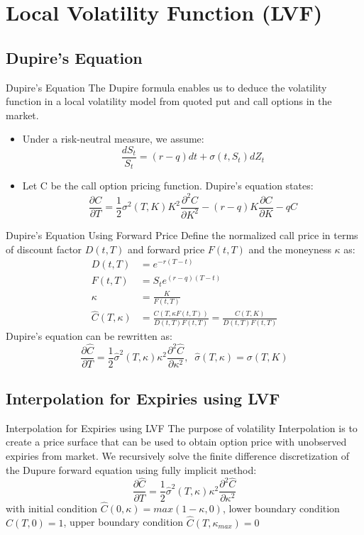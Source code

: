 \documentclass[10pt,table,mathserif]{beamer}
\begin{document}
\section{Local Volatility Function (LVF)}
\subsection{Dupire's Equation}
\begin{frame}{Dupire's Equation}
The Dupire formula enables us to deduce the volatility function in a local volatility
model from quoted put and call options in the market.
\begin{itemize}
	\item Under a risk-neutral measure, we assume:
	\[
	\frac{d S_t}{ S_t}= \left(r-q\right)dt +\sigma(t,S_t) dZ_t
	\]
	\item Let C be the call option pricing function. Dupire's equation states:
	\[
	\frac{\partial C}{\partial T}=\frac{1}{2} {\sigma}^2(T,K)K^2  \frac{\partial^2 C}{ \partial K^2}-(r-q) K\frac{\partial C}{\partial K}-qC
	\]
\end{itemize}
\end{frame}

\begin{frame}{Dupire's Equation Using Forward Price}
Define the normalized call price in terms of discount factor $D(t,T)$ and forward price $F(t,T)$ and the moneyness $\kappa$ as:
\[
\begin{split}
D(t,T)&=e^{-r(T-t)}\\
F(t,T)&=S_te^{(r-q)(T-t)}\\
\kappa&=\frac{K}{F(t,T)}\\
\widehat{C}(T,\kappa)&=\frac{C(T,\kappa F(t,T))}{D(t,T)F(t,T)}=\frac{C(T,K)}{D(t,T)F(t,T)}
\end{split}
\]
Dupire's equation can be rewritten as:
\[
\frac{\partial \widehat{C}}{\partial T}=\frac{1}{2} \widehat{\sigma}^2(T,\kappa) \kappa^2  \frac{\partial^2 \widehat{C}}{ \partial \kappa^2},\;\; \widehat{\sigma}(T,\kappa)={\sigma}(T,K)
\]
\end{frame}

\subsection{Interpolation  for Expiries using LVF}

\begin{frame}{Interpolation  for Expiries using LVF}
The purpose of volatility Interpolation \footnotemark \; is to create a price surface that can be used to obtain option price with unobserved expiries from market. We recursively solve the finite difference  discretization of the Dupure forward equation using fully implicit method:
\[
\frac{\partial \widehat{C}}{\partial T}=\frac{1}{2} \widehat{\sigma}^2(T,\kappa) \kappa^2  \frac{\partial^2 \widehat{C}}{ \partial \kappa^2}
\]
with initial condition $\widehat{C}(0,\kappa)=max(1-\kappa,0)$, lower boundary condition $\widehat{C}(T,0)=1$, upper boundary condition $\widehat{C}(T,\kappa_{max})=0$
\end{frame}
\end{document}
